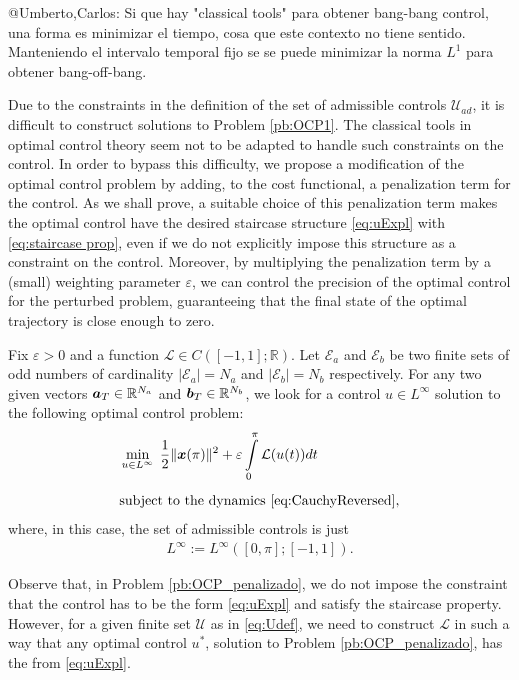 \documentclass[twocolumn]{autart}    %
\begin{document}
\JOStart
@Umberto,Carlos: Si que hay "classical tools" para obtener bang-bang control, una forma es minimizar el tiempo, cosa que este contexto no tiene sentido. Manteniendo el intervalo temporal fijo se se puede minimizar la norma $L^1$ para obtener bang-off-bang.
\JOEnd

Due to the constraints in the definition of the set of admissible controls $\mathcal{U}_{ad}$,  it is difficult to construct solutions to Problem \ref{pb:OCP1}. The classical tools in optimal control theory seem not to be adapted to handle such constraints on the control. In order to bypass this difficulty, we propose a modification of the optimal control problem by adding, to the cost functional, a penalization term for the control. As we shall prove, a suitable choice of this penalization term makes the optimal control have the desired staircase structure \eqref{eq:uExpl} with \eqref{eq:staircase prop}, even if we do not explicitly impose this structure as a constraint on the control. Moreover, by multiplying the penalization term by a (small) weighting parameter $\varepsilon$, we can control the precision of the optimal control for the perturbed problem, guaranteeing that the final state of the optimal trajectory is close enough to zero.

\bigskip

\begin{problem}\label{pb:OCP_penalizado}
Fix $\varepsilon>0$ and a function $\mathcal{L}\in C([-1,1];\mathbb{R})$.  Let $\mathcal{E} _a $ and $\mathcal{E} _b $ be two finite sets of odd numbers of cardinality $|\mathcal{E}_a| = N_a $ and $ |\mathcal{E} _b| = N_b$ respectively. For any two given vectors $\bm{a}_T \in \mathbb{R}^{N_a}$ and $\bm{b}_T \in \mathbb{R}^{N_b} $, we look for a control $u\in L^\infty$ solution to the following optimal control problem:
\begin{align*}
	&\displaystyle\min_{u \in L^\infty}\;\dfrac{1}{2} \|\bm{x}(\pi)\|^2 + \varepsilon \displaystyle\int_0^\pi \mathcal{L}(u(t)) dt 
	\\[5pt] 
	&\text{subject to the dynamics \eqref{eq:CauchyReversed}},
\end{align*}
where, in this case, the set of admissible controls is just 
\begin{align*}
	L^\infty:=L^\infty ([0,\pi]; [-1,1]).
\end{align*}
\end{problem}

Observe that, in Problem \ref{pb:OCP_penalizado}, we do not impose the constraint that the control has to be the form \eqref{eq:uExpl} and satisfy the staircase property. However, for a given finite set $\mathcal{U}$ as in \eqref{eq:Udef}, we need to construct $\mathcal{L}$ in such a way that any optimal control $u^\ast$, solution to Problem \ref{pb:OCP_penalizado}, has the from \eqref{eq:uExpl}.
\end{document}
